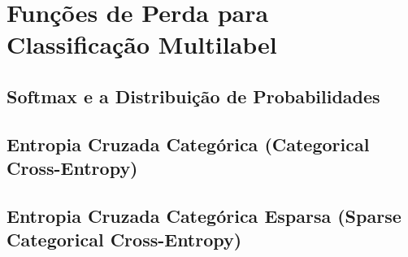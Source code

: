 
\chapter{Funções de Perda para Classificação Multilabel}
\label{cap:perda-multi}

\section{Softmax e a Distribuição de Probabilidades} 

\section{Entropia Cruzada Categórica (Categorical Cross-Entropy)} 

\section{Entropia Cruzada Categórica Esparsa (Sparse Categorical Cross-Entropy)}